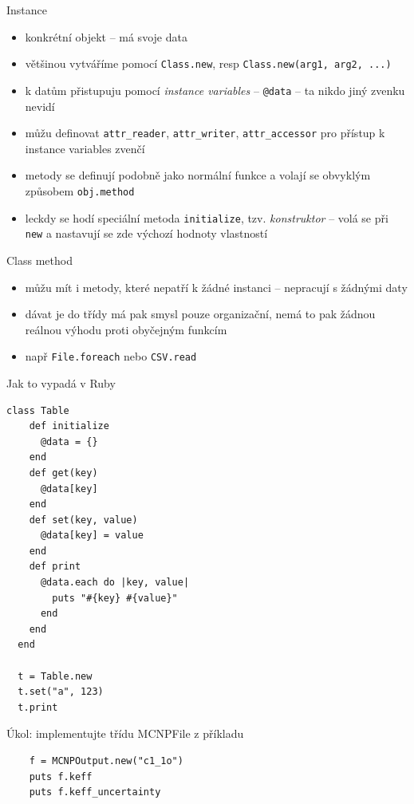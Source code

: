 \documentclass{beamer}
\begin{document}
\begin{frame}[containsverbatim]{Instance}
  \begin{itemize}
    \item konkrétní objekt – má svoje data
    \item většinou vytváříme pomocí \texttt{Class.new}, resp \texttt{Class.new(arg1, arg2, ...)}
    \item k datům přistupuju pomocí \emph{instance variables} -- \verb|@data| -- ta nikdo jiný zvenku nevidí
    \item můžu definovat \texttt{attr\_reader}, \texttt{attr\_writer}, \texttt{attr\_accessor} pro přístup k instance variables zvenčí
    \item metody se definují podobně jako normální funkce a volají se obvyklým způsobem \texttt{obj.method}
    \item leckdy se hodí speciální metoda \texttt{initialize}, tzv. \emph{konstruktor} -- volá se při \texttt{new} a nastavují se zde výchozí hodnoty vlastností
  \end{itemize}
\end{frame}

\begin{frame}{Class method}
  \begin{itemize}
    \item můžu mít i metody, které nepatří k žádné instanci – nepracují s žádnými daty
    \item dávat je do třídy má pak smysl pouze organizační, nemá to pak žádnou reálnou výhodu proti obyčejným funkcím
    \item např \texttt{File.foreach} nebo \texttt{CSV.read}
  \end{itemize}
\end{frame}

\begin{frame}[containsverbatim]{Jak to vypadá v Ruby}
  \begin{Verbatim}[fontsize=\tiny]
  class Table
    def initialize
      @data = {}
    end
    def get(key)
      @data[key]
    end
    def set(key, value)
      @data[key] = value
    end
    def print
      @data.each do |key, value|
        puts "#{key} #{value}"
      end
    end
  end

  t = Table.new
  t.set("a", 123)
  t.print
  \end{Verbatim}
\end{frame}

\begin{frame}[containsverbatim]{Úkol: implementujte třídu MCNPFile z příkladu}
  \begin{verbatim}
    f = MCNPOutput.new("c1_1o")
    puts f.keff
    puts f.keff_uncertainty
  \end{verbatim}
\end{frame}
\end{document}
